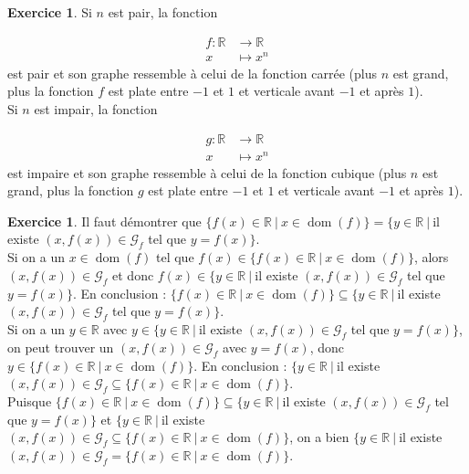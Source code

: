 \documentclass[a4paper,13pt]{scrreprt}
\theoremstyle{plain}
\theoremstyle{definition}
\newtheorem{exo}[subsection]{Exercice}
\newcommand{\rr}{\mathbb{R}}
\DeclareMathOperator{\dom}{dom}
\begin{document}
\begin{exo}
	Si $n$ est pair, la fonction
	\item \begin{align*}
	f : {\rr} &\to \rr \\
	x &\mapsto x^n
	\end{align*}
	est pair et son graphe ressemble à celui de la fonction carrée (plus $n$ est grand, plus la fonction $f$ est plate entre $-1$ et $1$ et verticale avant $-1$ et après $1$). \\
	Si $n$ est impair, la fonction
	\item \begin{align*}
	g : {\rr} &\to \rr \\
	x &\mapsto x^n
	\end{align*}
	est impaire et son graphe ressemble à celui de la fonction cubique (plus $n$ est grand, plus la fonction $g$ est plate entre $-1$ et $1$ et verticale avant $-1$ et après $1$).
\end{exo}

\begin{exo}
	Il faut démontrer que $\{f(x) \in \rr~|~x \in \dom(f)\} = \{y \in \rr~|~$il existe $(x,f(x))\in {\mathcal{G}}_{f}$ tel que $y=f(x)\}$. \\
	Si on a un $x \in \dom (f)$ tel que $f(x) \in \{f(x) \in \rr~|~x \in \dom(f)\}$, alors $(x,f(x)) \in {\mathcal{G}}_{f}$ et donc $f(x) \in \{y \in \rr~|~$il existe $(x,f(x))\in {\mathcal{G}}_{f}$ tel que $y=f(x)\}$. En conclusion : $\{f(x) \in \rr~|~x \in \dom(f)\} \subseteq \{y \in \rr~|~$il existe $(x,f(x))\in {\mathcal{G}}_{f}$ tel que $y=f(x)\}$. \\
	Si on a un $y \in \rr$ avec $y \in \{y \in \rr~|~$il existe $(x,f(x))\in {\mathcal{G}}_{f}$ tel que $y=f(x)\}$, on peut trouver un $(x,f(x))\in {\mathcal{G}}_{f}$ avec $y=f(x)$, donc $y \in \{f(x) \in \rr~|~x \in \dom(f)\}$. En conclusion : $\{y \in \rr~|~$il existe $(x,f(x))\in {\mathcal{G}}_{f} \subseteq  \{f(x) \in \rr~|~x \in \dom(f)\}$. \\
	Puisque $\{f(x) \in \rr~|~x \in \dom(f)\} \subseteq \{y \in \rr~|~$il existe $(x,f(x))\in {\mathcal{G}}_{f}$ tel que $y=f(x)\}$ et $\{y \in \rr~|~$il existe $(x,f(x))\in {\mathcal{G}}_{f} \subseteq  \{f(x) \in \rr~|~x \in \dom(f)\}$, on a bien $\{y \in \rr~|~$il existe $(x,f(x))\in {\mathcal{G}}_{f} =  \{f(x) \in \rr~|~x \in \dom(f)\}$.
\end{exo}
\end{document}
